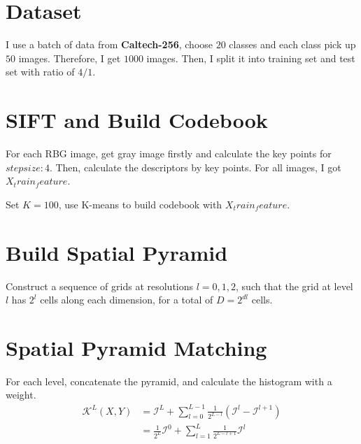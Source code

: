 \documentclass[10pt,twocolumn,letterpaper]{article}
\begin{document}
\section{Dataset}
I use a batch of data from \textbf{Caltech-256}, choose $20$ classes and each class pick up $50$ images. Therefore, I get $1000$ images. Then, I split it into training set and test set with ratio of $4/1$.
\section{SIFT and Build Codebook}
For each RBG image, get gray image firstly and calculate the key points for $step size: 4$. Then, calculate the descriptors by key points. For all images, I got $X_train_feature$.\\
\par Set $K = 100$, use K-means to build codebook with $X_train_feature$.
\section{Build Spatial Pyramid}
Construct a sequence of grids at resolutions $l=0,1,2$, such that the grid at level $l$ has $2^l$ cells along each dimension, for a total of $D = 2^{dl}$ cells.
\section{Spatial Pyramid Matching}
For each level, concatenate the pyramid, and calculate the histogram with a weight.
\begin{equation}
\begin{aligned}
\mathcal{K}^L(X, Y) &=\mathcal{I}^L + {\displaystyle \sum_{l=0}^{L-1}\frac{1}{2^{L-l}}(\mathcal{I}^l-\mathcal{I}^{l+1})}\\
&=\frac{1}{2^L}\mathcal{I}^0+{\displaystyle \sum_{l=1}^{L}\frac{1}{2^{L-l+1}}\mathcal{I}^l}
\end{aligned}
\end{equation}
\end{document}
